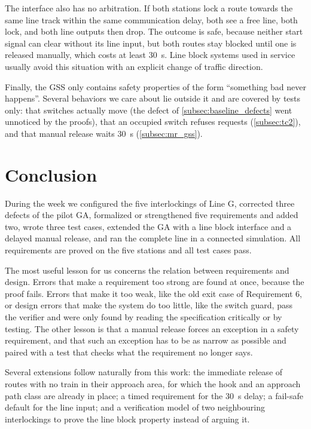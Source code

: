 \documentclass[a4paper,12pt]{article}
\begin{document}
The interface also has no arbitration. If both stations lock a route towards the same line track within the same communication delay, both see a free line, both lock, and both line outputs then drop. The outcome is safe, because neither start signal can clear without its line input, but both routes stay blocked until one is released manually, which costs at least 30~s. Line block systems used in service usually avoid this situation with an explicit change of traffic direction.

Finally, the GSS only contains safety properties of the form ``something bad never happens''. Several behaviors we care about lie outside it and are covered by tests only: that switches actually move (the defect of \cref{subsec:baseline_defects} went unnoticed by the proofs), that an occupied switch refuses requests (\cref{subsec:tc2}), and that manual release waits 30~s (\cref{subsec:mr_gss}).

\section{Conclusion}
\label{sec:conclusion}

During the week we configured the five interlockings of Line G, corrected three defects of the pilot GA, formalized or strengthened five requirements and added two, wrote three test cases, extended the GA with a line block interface and a delayed manual release, and ran the complete line in a connected simulation. All requirements are proved on the five stations and all test cases pass.

The most useful lesson for us concerns the relation between requirements and design. Errors that make a requirement too strong are found at once, because the proof fails. Errors that make it too weak, like the old exit case of Requirement 6, or design errors that make the system do too little, like the switch guard, pass the verifier and were only found by reading the specification critically or by testing. The other lesson is that a manual release forces an exception in a safety requirement, and that such an exception has to be as narrow as possible and paired with a test that checks what the requirement no longer says.

Several extensions follow naturally from this work: the immediate release of routes with no train in their approach area, for which the hook and an approach path class are already in place; a timed requirement for the 30~s delay; a fail-safe default for the line input; and a verification model of two neighbouring interlockings to prove the line block property instead of arguing it.

\clearpage
\printbibliography[title={References}]
\end{document}
